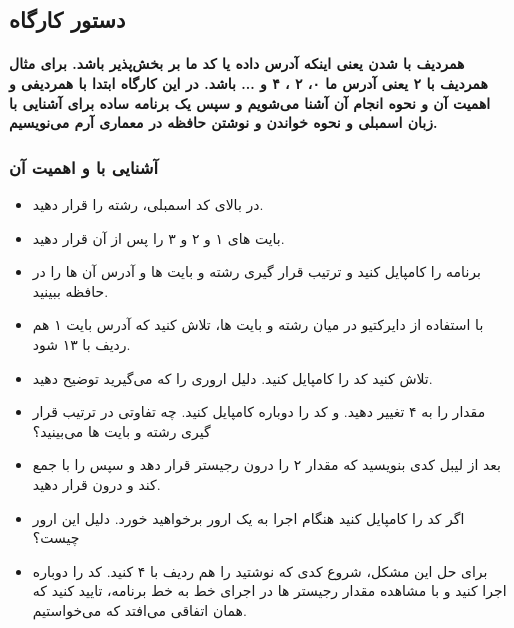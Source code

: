 \subsection{دستور کارگاه}

\paragraph{
همردیف با  شدن یعنی اینکه آدرس داده یا کد ما بر  بخش‌پذیر باشد. برای مثال همردیف با ۲ یعنی آدرس ما ۰، ۲ ، ۴ و ... باشد. در این کارگاه ابتدا با همردیفی و اهمیت آن و نحوه انجام آن آشنا می‌شویم و سپس یک برنامه ساده برای آشنایی با زبان اسمبلی و نحوه خواندن و نوشتن حافظه در معماری آرم می‌نویسیم.
}

\subsubsection{آشنایی با  و اهمیت آن}
\begin{itemize}
    \item در بالای کد اسمبلی، رشته  را قرار دهید.
    \item بایت های ۱ و ۲ و ۳ را پس از آن قرار دهید.
    \item برنامه را کامپایل کنید و ترتیب قرار گیری رشته و بایت ها و آدرس آن ها را در حافظه ببینید.
    \item با استفاده از دایرکتیو  در میان رشته و بایت ها، تلاش کنید که آدرس بایت ۱ هم ردیف با ۱۳ شود.
    \item تلاش کنید کد را کامپایل کنید. دلیل اروری را که می‌گیرید توضیح دهید.
    \item مقدار  را به ۴ تغییر دهید. و کد را دوباره کامپایل کنید. چه تفاوتی در ترتیب قرار گیری رشته و بایت ها می‌بینید؟
    \item بعد از لیبل  کدی بنویسید که مقدار ۲ را درون رجیستر  قرار دهد و سپس  را با  جمع کند و درون  قرار دهید.
    \item اگر کد را کامپایل کنید هنگام اجرا به یک ارور برخواهید خورد. دلیل این ارور چیست؟
    \item برای حل این مشکل، شروع کدی که نوشتید را هم ردیف با ۴ کنید. کد را دوباره اجرا کنید و با مشاهده مقدار رجیستر ها در اجرای خط به خط برنامه، تایید کنید که همان اتفاقی می‌افتد که می‌خواستیم.
\end{itemize}

